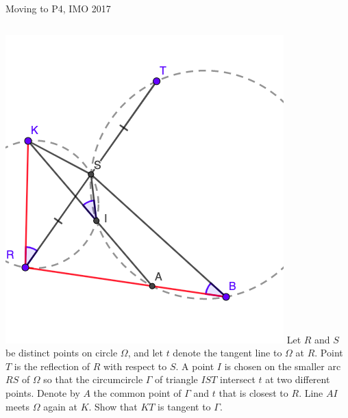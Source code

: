 \documentclass{beamer}
\begin{document}
\begin{frame}{Moving to P4, IMO 2017}
	\begin{columns}
		\includegraphics[scale=0.46]{spi6.png}
		\small{
		Let $R$ and $S$ be distinct points on circle $\Omega$,
		and let $t$ denote the tangent line to $\Omega$ at $R$.
		Point $T$ is the reflection of $R$ with respect to $S$.
		A point $I$ is chosen on the smaller arc $RS$ of 
		$\Omega$ so that the circumcircle $\Gamma$ of triangle
		$IST$ intersect $t$ at two different points. Denote by
		$A$ the common point of $\Gamma$ and $t$ that is closest
		to $R$. Line $AI$ meets $\Omega$ again at $K$. Show that
		$KT$ is tangent to $\Gamma$.
		}
	\end{columns}
\end{frame}
\end{document}
